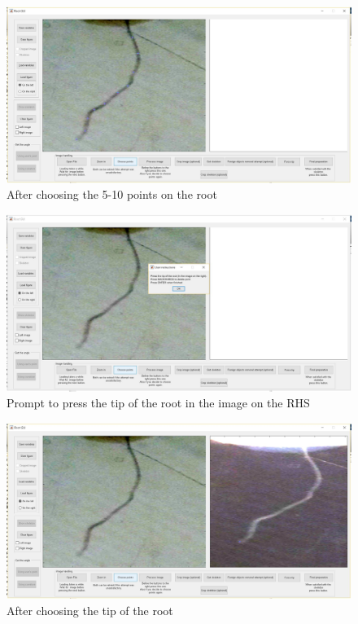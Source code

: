 \begin{figure}[H]
	\centering
	\includegraphics[width=\textwidth]{../Figures/manual/step10.jpg}
	\caption{After choosing the 5-10 points on the root}
	\label{fig:img13}
\end{figure}

\begin{figure}[H]
	\centering
	\includegraphics[width=\textwidth]{../Figures/manual/step11.jpg}
	\caption{Prompt to press the tip of the root in the image on the RHS}
	\label{fig:img14}
\end{figure}

\begin{figure}[H]
	\centering
	\includegraphics[width=\textwidth]{../Figures/manual/step12.jpg}
	\caption{After choosing the tip of the root}
	\label{fig:img15}
\end{figure}


